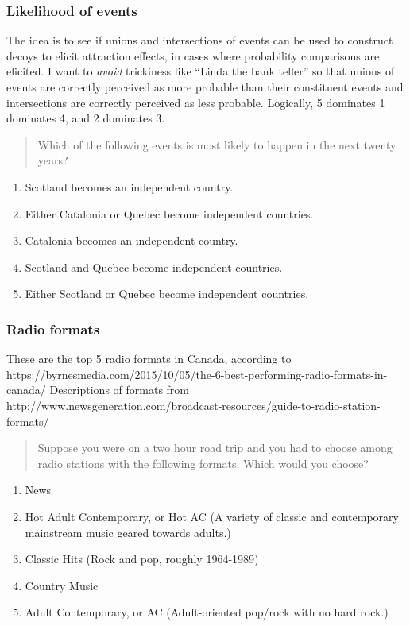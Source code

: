 \documentclass[11pt,letter]{amsart}
\begin{document}
\subsubsection{Likelihood of events}

The idea is to see if unions and intersections of events can be used to
construct decoys to elicit attraction effects, in cases where probability
comparisons are elicited.
I want to \emph{avoid} trickiness like ``Linda the bank teller'' so that unions of events are correctly perceived as more probable than their constituent events and intersections are correctly perceived as less probable.
Logically, 5 dominates 1 dominates 4, and 2 dominates 3.

\begin{quotation}
Which of the following events is most likely to happen in the next twenty years?
\end{quotation}

\begin{enumerate}
\item Scotland becomes an independent country. 

\item Either Catalonia or Quebec become independent countries. 

\item Catalonia becomes an independent country. 

\item Scotland and Quebec become independent countries. 

\item Either Scotland or Quebec become independent countries.
\end{enumerate}

\subsubsection{Radio formats}

These are the top 5 radio formats in Canada, according to https://byrnesmedia.com/2015/10/05/the-6-best-performing-radio-formats-in-canada/
Descriptions of formats from
http://www.newsgeneration.com/broadcast-resources/guide-to-radio-station-formats/

\begin{quotation}
	Suppose you were on a two hour road trip and you had to choose among radio stations with the following formats. Which would you choose?
\end{quotation}

\begin{enumerate}
	\item News
	\item Hot Adult Contemporary, or Hot AC
	(A variety of classic and contemporary mainstream music geared towards adults.)
	\item Classic Hits (Rock and pop, roughly 1964-1989)
	\item Country Music
	\item Adult Contemporary, or AC (Adult-oriented pop/rock with no hard rock.)
\end{enumerate}
\end{document}
